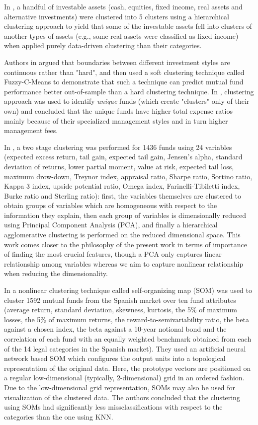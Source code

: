 \documentclass[sigconf]{acmart}
\begin{document}
In \cite{lamponi2015data}, a handful of investable assets (cash, equities, fixed income, real assets and alternative investments) were clustered into 5 clusters using a hierarchical clustering approach to yield that some of the investable assets fell into clusters of another types of assets (e.g., some real assets were classified as fixed income) when applied purely data-driven clustering than their categories.


Authors in \cite{lajbcygier2008soft} argued that boundaries between different investment styles are continuous rather than "hard", and then used a soft clustering technique called Fuzzy-C-Means to demonstrate that such a technique can predict mutual fund performance better out-of-sample than a hard clustering technique. In \cite{vozlyublennaia2018mutual}, clustering approach was used to identify \textit{unique} funds (which create "clusters" only of their own) and concluded that the unique funds have higher total expense ratios mainly because of their specialized management styles and in turn higher management fees.

In \cite{menardi2015double}, a two stage clustering was performed for 1436 funds using 24 variables (expected excess return, tail gain, expected tail gain, Jensen's alpha, standard deviation of returns, lower partial moment, value at risk, expected tail loss, maximum drow-down, Treynor index, appraisal ratio, Sharpe ratio, Sortino ratio, Kappa 3 index, upside potential ratio, Omega index, Farinelli-Tibiletti index, Burke ratio and Sterling ratio): first, the variables themselves are clustered to obtain groups of variables which are homogeneous with respect to the information they explain, then each group of variables is dimensionally reduced using Principal Component Analysis (PCA), and finally a hierarchical agglomerative clustering is performed on the reduced dimensional space. This work comes closer to the philosophy of the present work in terms of importance of finding the most crucial features, though a PCA only captures linear relationship among variables whereas we aim to capture nonlinear relationship when reducing the dimensionality.

In \cite{moreno2006self} a nonlinear clustering technique called self-organizing map (SOM) \cite{kohonen1990self} was used to cluster 1592 mutual funds from the Spanish market over ten fund attributes (average return, standard deviation, skewness, kurtosis, the 5\% of maximum losses, the 5\% of maximum returns, the reward-to-semivariability ratio, the beta against a chosen index, the beta against a 10-year notional bond and the correlation of each fund with an equally weighted benchmark obtained from each of the 14 legal categories in the Spanish market). They used an artificial neural network based SOM which configures the output units into a topological representation of the original data. Here, the prototype vectors are positioned on a regular low-dimensional (typically, 2-dimensional) grid in an ordered fashion. Due to the low-dimensional grid representation, SOMs may also be used for visualization of the clustered data. The authors concluded that the clustering using SOMs had significantly less missclassifications with respect to the categories than the one using KNN.
\end{document}
